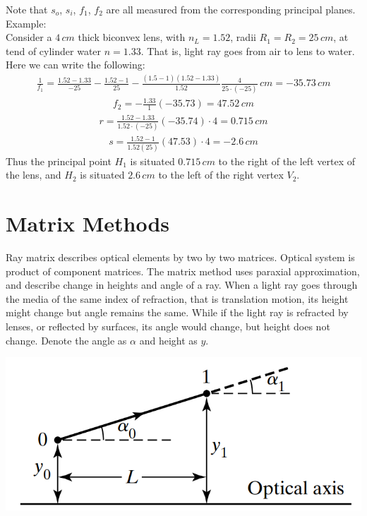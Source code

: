 \documentclass[11pt]{book}
\theoremstyle{break}
\theoremstyle{break}
\newcommand{\example}{\color{green}Example: \color{black}}
\begin{document}
Note that $s_o$, $s_i$, $f_1$, $f_2$ are all measured from the corresponding principal planes. \\

\example\\
Consider a $4\, cm$ thick biconvex lens, with $n_L=1.52$, radii $R_1 = R_2 = 25\, cm$, at tend of cylinder water $n = 1.33$. That is, light ray goes from air to lens to water. Here we can write the following:
\begin{align*}
\frac{1}{f_1} = \frac{1.52 - 1.33}{-25} - \frac{1.52-1}{25} - \frac{(1.5-1)(1.52-1.33)}{1.52} \frac{4}{25\cdot (-25)}\, cm = -35.73\, cm
\end{align*}
\begin{align*}
f_2 = -\frac{1.33}{1}(-35.73) = 47.52\, cm
\end{align*}
\begin{align*}
r = \frac{1.52-1.33}{1.52\cdot(-25)}(-35.74)\cdot 4 = 0.715\, cm
\end{align*}
\begin{align*}
s = \frac{1.52-1}{1.52(25)}(47.53)\cdot 4 = -2.6\, cm
\end{align*}
Thus the principal point $H_1$ is situated $0.715\, cm$ to the right of the left vertex of the lens, and $H_2$ is situated $2.6\, cm$ to the left of the right vertex $V_2$. 

\newpage
\section[Matrix Methods]{\color{red}Matrix Methods\color{black}} 
Ray matrix describes optical elements by two by two matrices. Optical system is product of component matrices. The matrix method uses paraxial approximation, and describe change in heights and angle of a ray. When a light ray goes through the media of the same index of refraction, that is translation motion, its height might change but angle remains the same. While if the light ray is refracted by lenses, or reflected by surfaces, its angle would change, but height does not change. Denote the angle as $\alpha$ and height as $y$. 
\begin{center}
\includegraphics[scale=0.31]{trans.png}
\end{center}
\end{document}
